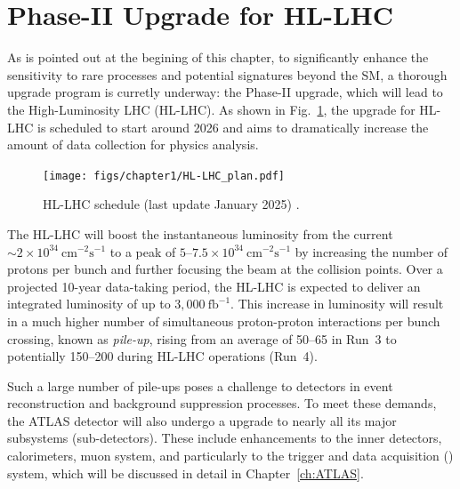 \section{Phase-II Upgrade for HL-LHC} \label{sec:upgrade}
As is pointed out at the begining of this chapter, to significantly enhance the sensitivity to rare processes and potential signatures beyond the SM, a thorough upgrade program is curretly underway: the Phase-II upgrade, which will lead to the High-Luminosity LHC (HL-LHC). As shown in Fig.~\ref{fig:HL-LHC}, the upgrade for HL-LHC is scheduled to start around 2026 and aims to dramatically increase the amount of data collection for physics analysis.

\begin{figure}[htbp]
  \centering
  \texttt{[image: figs/chapter1/HL-LHC\_plan.pdf]}
  \caption{HL-LHC schedule (last update January 2025) \cite{HL-LHC}.}
  \label{fig:HL-LHC}
\end{figure}

The HL-LHC will boost the instantaneous luminosity from the current $\sim 2 \times 10^{34}~\mathrm{cm}^{-2}\mathrm{s}^{-1}$ to a peak of $5$–$7.5 \times 10^{34}~\mathrm{cm}^{-2}\mathrm{s}^{-1}$ by increasing the number of protons per bunch and further focusing the beam at the collision points. Over a projected 10-year data-taking period, the HL-LHC is expected to deliver an integrated luminosity of up to $3,000~\mathrm{fb}^{-1}$. This increase in luminosity will result in a much higher number of simultaneous proton-proton interactions per bunch crossing, known as \textit{pile-up}, rising from an average of 50–65 in Run~3 to potentially 150–200 during HL-LHC operations (Run~4).

Such a large number of pile-ups poses a challenge to detectors in event reconstruction and background suppression processes. To meet these demands, the ATLAS detector will also undergo a upgrade to nearly all its major subsystems (sub-detectors). These include enhancements to the inner detectors, calorimeters, muon system, and particularly to the trigger and data acquisition (\TDAQ) system, which will be discussed in detail in Chapter~\ref{ch:ATLAS}.

